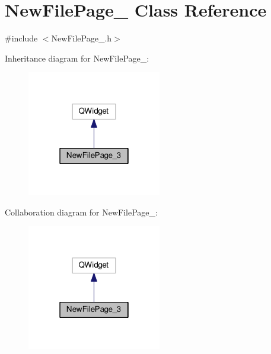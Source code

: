 \hypertarget{class_new_file_page__3}{\section{New\-File\-Page\-\_ Class Reference}
\label{class_new_file_page__3}
}


{\ttfamily \#include $<$New\-File\-Page\-\_.\-h$>$}



Inheritance diagram for New\-File\-Page\-\_\-:\nopagebreak
\begin{figure}[H]
\begin{center}
\leavevmode
\includegraphics[width=166pt]{class_new_file_page__3__inherit__graph}
\end{center}
\end{figure}


Collaboration diagram for New\-File\-Page\-\_\-:\nopagebreak
\begin{figure}[H]
\begin{center}
\leavevmode
\includegraphics[width=166pt]{class_new_file_page__3__coll__graph}
\end{center}
\end{figure}
